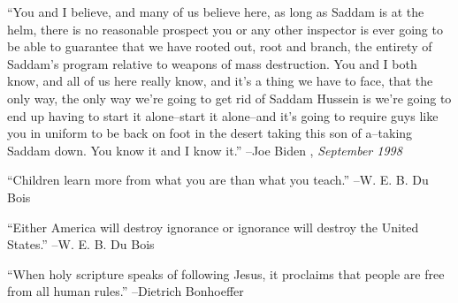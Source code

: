 \documentclass{article}%
\begin{document}
\linebreak%
\vspace{1mm}%
\begin{minipage}{\textwidth}%
\flushleft%
“You and I believe, and many of us believe here, as long as Saddam is at the helm, there is no reasonable prospect you or any other inspector is ever going to be able to guarantee that we have rooted out, root and branch, the entirety of Saddam's program relative to weapons of mass destruction. You and I both know, and all of us here really know, and it's a thing we have to face, that the only way, the only way we're going to get rid of Saddam Hussein is we're going to end up having to start it alone–start it alone–and it's going to require guys like you in uniform to be back on foot in the desert taking this son of a–taking Saddam down. You know it and I know it.”%
\linebreak%
\vspace{1mm}%
–Joe Biden%
, \textit{September 1998}%
\linebreak%
\vspace{1mm}%
\end{minipage}%
\linebreak%
\vspace{1mm}%
\begin{minipage}{\textwidth}%
\flushleft%
“Children learn more from what you are than what you teach.”%
\linebreak%
\vspace{1mm}%
–W. E. B. Du Bois%
\linebreak%
\vspace{1mm}%
\end{minipage}%
\linebreak%
\vspace{1mm}%
\begin{minipage}{\textwidth}%
\flushleft%
“Either America will destroy ignorance or ignorance will destroy the United States.”%
\linebreak%
\vspace{1mm}%
–W. E. B. Du Bois%
\linebreak%
\vspace{1mm}%
\end{minipage}%
\linebreak%
\vspace{1mm}%
\begin{minipage}{\textwidth}%
\flushleft%
“When holy scripture speaks of following Jesus, it proclaims that people are free from all human rules.”%
\linebreak%
\vspace{1mm}%
–Dietrich Bonhoeffer%
\linebreak%
\vspace{1mm}%
\end{minipage}%
\end{document}
